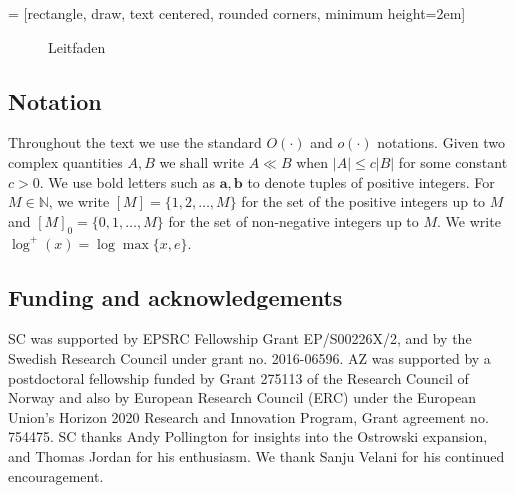 \documentclass[12pt, reqno]{amsart}
\theoremstyle{definition}
\theoremstyle{remark}
\numberwithin{equation}{section}
\def\ls{\leqslant} \def\gs{\geqslant}
\def \bN {\mathbb N}
\def \ba {\mathbf a}
\def \bb {\mathbf b}
\begin{document}
	 = [rectangle, draw, text centered, rounded corners, minimum height=2em]
	\begin{figure}[!htb] 
		\centering
		\caption{Leitfaden}
		\label{Leitfaden}
	\end{figure}
	
	\subsection*{Notation}
	Throughout the text we use the standard $O(\cdot)$ and $o(\cdot)$ notations. Given two complex quantities $A,B$ we shall write $A \ll B$ when  $|A| \ls c |B|$ for some constant $c>0$. We use bold letters such as $\ba, \bb$ to denote tuples of positive integers. For $M \in \bN$, we write $[M] =
	\{1,2,\ldots,M\}$ for the set of the positive integers up to $M$ and $[M]_0 = \{0,1,\ldots, M\}$ for the set of non-negative integers up to $M.$ We write
	$\log^+(x) = \log \max \{x, e \}$.
	
	\subsection*{Funding and acknowledgements} 
	
	SC was supported by EPSRC Fellowship Grant EP/S00226X/2, and by the Swedish Research Council under grant no. 2016-06596. AZ was supported by a postdoctoral fellowship funded by Grant 275113 of the Research Council
	of Norway and also by European Research Council (ERC) under the European Union’s Horizon 2020 Research and Innovation Program, Grant agreement no. 754475. SC thanks Andy Pollington for insights into the Ostrowski expansion, and Thomas Jordan for his enthusiasm. We thank Sanju Velani for his continued encouragement.
	
\end{document}
